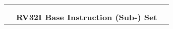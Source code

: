
\begin{table}[p]
\begin{small}
\begin{center}
		\begin{tabular}{ccccccp{0.3in}p{0.3in}p{0.3in}cp{0.6in}l}
& & & & & & & & & & \\
%
%
%
%
%
%
%
%
%
%
%
%
%

&
\multicolumn{10}{c}{} & \\
&
\multicolumn{10}{c}{\bf RV32I Base Instruction (Sub-) Set} & \\


\end{tabular}
\end{center}
\end{small}
\end{table}
